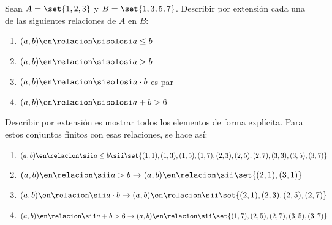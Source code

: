 \begin{enunciado}{\ejercicio}
  Sean $A = \set{1, 2, 3}$ y $B = \set{1, 3, 5, 7}$. Describir por extensión cada una de las
  siguientes relaciones de $A$ en $B$:

  \begin{multicols}{2}
    \begin{enumerate}[label=\roman*)]
      \item $(a,b) \en \relacion \sisolosi a \leq b $

      \item $(a,b) \en \relacion \sisolosi a > b$

      \item $(a,b) \en \relacion \sisolosi a \cdot b$ es par

      \item $(a,b) \en \relacion \sisolosi a + b > 6$
    \end{enumerate}
  \end{multicols}
\end{enunciado}
Describir por extensión es mostrar todos los elementos de forma explícita. Para estos conjuntos finitos con esas relaciones,
se hace así:

\begin{enumerate}[label=\roman*)]
  \item $(a,b) \en \relacion \sii a\leq b \sii   \set{(1,1), (1,3), (1,5), (1,7), (2,3), (2,5), (2,7), (3,3), (3,5), (3,7)}$

  \item $(a,b) \en \relacion \sii a > b \to     (a,b) \en \relacion \sii   \set{(2,1), (3, 1)}$

  \item $(a,b) \en \relacion \sii a \cdot b \to (a,b) \en \relacion \sii    \set{(2,1), (2,3), (2,5), (2,7)}$

  \item $(a,b) \en \relacion \sii a + b > 6 \to (a,b) \en \relacion \sii\set{(1,7), (2,5), (2, 7), (3, 5), (3, 7)}$
\end{enumerate}

\begin{aportes}
  \item {}
\end{aportes}

